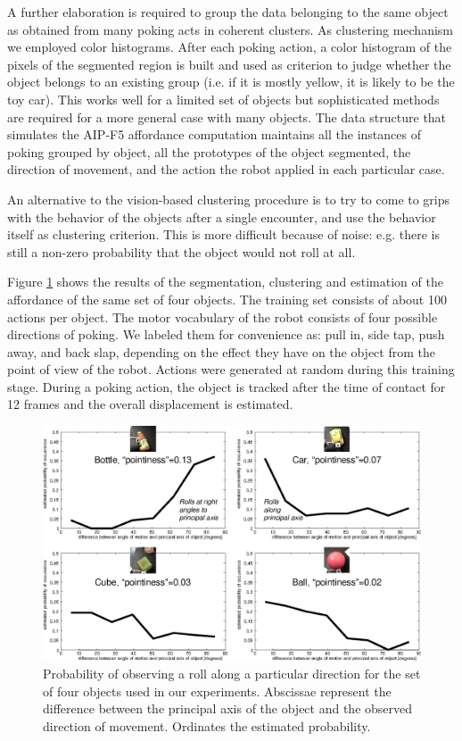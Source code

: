 A further elaboration is required to group the data belonging to the same
object as obtained from many poking acts in coherent clusters. As clustering 
mechanism we employed color histograms. After each poking action, a color histogram 
of the pixels of the segmented region is built and used as criterion 
to judge whether the object belongs to an existing group (i.e. if it
is mostly yellow, it is likely to be the toy car). This works well
for a limited set of objects but sophisticated methods are 
required for a more general case with many objects. 
The data structure that simulates the AIP-F5 affordance computation maintains all 
the instances of poking grouped by object, all the prototypes of the object segmented,
the direction of movement, and the action the robot applied in each particular case.

An alternative to the vision-based clustering procedure is to try to come 
to grips with the behavior of the objects after a single encounter, and use 
the behavior itself as clustering criterion. This is more difficult because 
of noise: e.g. there is still a non-zero probability that the object would 
not roll at all.

Figure \ref{fig:affordances} shows the results of the segmentation, clustering
and estimation of the affordance of the same set of four objects. The training set
consists of about 100 actions per object. The motor vocabulary of the robot
consists of four possible directions of poking. We labeled them for convenience
as: pull in, side tap, push away, and back slap, depending on the effect they
have on the object from the point of view of the robot. Actions were generated
at random during this training stage. During a poking action, the object is
tracked after the time of contact for 12 frames and the overall displacement is
estimated. 

\begin{figure}[tbh]
\begin{center}
\includegraphics[width=\columnwidth]{affordances.eps}
\caption{ 
\label{fig:affordances}
%
Probability of observing a roll along a particular direction for the set
of four objects used in our experiments. Abscissae represent the difference
between the principal axis of the object and the observed direction of 
movement. Ordinates the estimated probability.
%
}
\end{center}
\end{figure}

